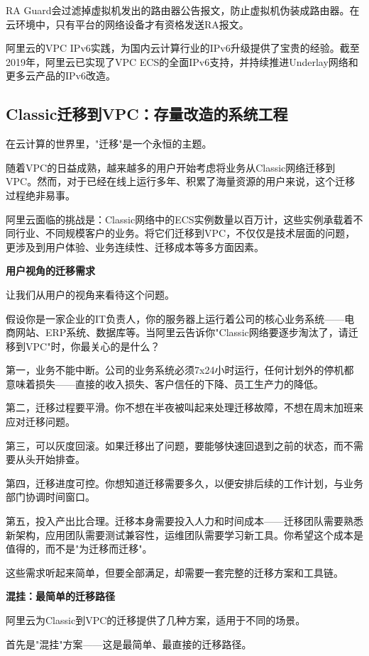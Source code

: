 RA Guard会过滤掉虚拟机发出的路由器公告报文，防止虚拟机伪装成路由器。在云环境中，只有平台的网络设备才有资格发送RA报文。

阿里云的VPC IPv6实践，为国内云计算行业的IPv6升级提供了宝贵的经验。截至2019年，阿里云已实现了VPC ECS的全面IPv6支持，并持续推进Underlay网络和更多云产品的IPv6改造。

\subsection{Classic迁移到VPC：存量改造的系统工程}

在云计算的世界里，"迁移"是一个永恒的主题。

随着VPC的日益成熟，越来越多的用户开始考虑将业务从Classic网络迁移到VPC。然而，对于已经在线上运行多年、积累了海量资源的用户来说，这个迁移过程绝非易事。

阿里云面临的挑战是：Classic网络中的ECS实例数量以百万计，这些实例承载着不同行业、不同规模客户的业务。将它们迁移到VPC，不仅仅是技术层面的问题，更涉及到用户体验、业务连续性、迁移成本等多方面因素。

\textbf{用户视角的迁移需求}

让我们从用户的视角来看待这个问题。

假设你是一家企业的IT负责人，你的服务器上运行着公司的核心业务系统——电商网站、ERP系统、数据库等。当阿里云告诉你"Classic网络要逐步淘汰了，请迁移到VPC"时，你最关心的是什么？

第一，业务不能中断。公司的业务系统必须7x24小时运行，任何计划外的停机都意味着损失——直接的收入损失、客户信任的下降、员工生产力的降低。

第二，迁移过程要平滑。你不想在半夜被叫起来处理迁移故障，不想在周末加班来应对迁移问题。

第三，可以灰度回滚。如果迁移出了问题，要能够快速回退到之前的状态，而不需要从头开始排查。

第四，迁移进度可控。你想知道迁移需要多久，以便安排后续的工作计划，与业务部门协调时间窗口。

第五，投入产出比合理。迁移本身需要投入人力和时间成本——迁移团队需要熟悉新架构，应用团队需要测试兼容性，运维团队需要学习新工具。你希望这个成本是值得的，而不是"为迁移而迁移"。

这些需求听起来简单，但要全部满足，却需要一套完整的迁移方案和工具链。

\textbf{混挂：最简单的迁移路径}

阿里云为Classic到VPC的迁移提供了几种方案，适用于不同的场景。

首先是"混挂"方案——这是最简单、最直接的迁移路径。

